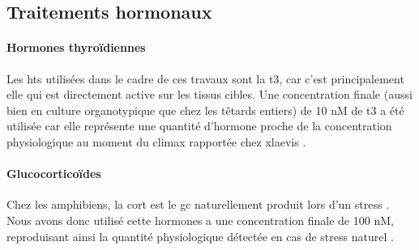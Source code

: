 \documentclass[../main.tex]{subfiles}
\begin{document}

\subsection{Traitements hormonaux}

\paragraph{Hormones thyroïdiennes}
Les \glspl{ht} utilisées dans le cadre de ces travaux sont la \gls{t3}, car c'est principalement elle qui est directement active sur les tissus cibles.
Une concentration finale (aussi bien en culture organotypique que chez les têtards entiers) de 10 nM de \gls{t3} a été utilisée car elle représente une quantité d'hormone proche de la concentration physiologique au moment du climax rapportée chez \gls{xlaevis} \citep{Leloup1977}.

\paragraph{Glucocorticoïdes}
Chez les amphibiens, la \gls{cort} est le \gls{gc} naturellement produit lors d'un stress .
Nous avons donc utilisé cette hormones a une concentration finale de 100 nM, reproduisant ainsi la quantité physiologique détectée en cas de stress naturel \citep{JolivetJaudet1984,Krain2004}.
\end{document}
